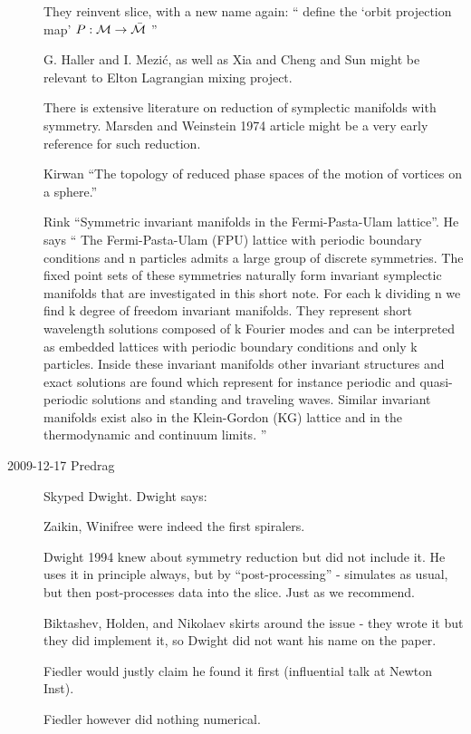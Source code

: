 \begin{description}
They reinvent slice, with a new name again:
``
define the `orbit projection map'
$P: {\cal M} \to \bar{\cal M} $
''

G. Haller and I. Mezi\'c, as well as Xia
and Cheng and Sun might be relevant to Elton
Lagrangian mixing project.

There is extensive literature on reduction of symplectic manifolds with
symmetry.
Marsden and Weinstein 1974 article
might be a very early reference for such reduction.

Kirwan ``The topology of reduced phase spaces of
the motion of vortices on a sphere.''

 Rink
``Symmetric invariant manifolds in
  the  {Fermi-Pasta-Ulam} lattice''. He says ``
The Fermi-Pasta-Ulam (FPU) lattice with periodic boundary
conditions and n particles admits a large group of discrete
symmetries. The fixed point sets of these symmetries naturally
form invariant symplectic manifolds that are investigated in
this short note. For each k dividing n we find k degree of
freedom invariant manifolds. They represent short wavelength
solutions composed of k Fourier modes and can be interpreted as
embedded lattices with periodic boundary conditions and only k
particles. Inside these invariant manifolds other invariant
structures and exact solutions are found which represent for
instance periodic and quasi-periodic solutions and standing and
traveling waves. Similar invariant manifolds exist also in the
Klein-Gordon (KG) lattice and in the thermodynamic and
continuum limits.
''

\item[2009-12-17 Predrag] Skyped Dwight.
Dwight says:

Zaikin, Winifree were indeed the first spiralers.

Dwight 1994 knew about symmetry reduction but did not
include it. He uses it in principle always, but by ``post-processing''
- simulates as usual, but then post-processes data into the slice.
Just as we recommend.

Biktashev, Holden, and Nikolaev
skirts around the issue - they wrote it
 but they did implement it, so Dwight did not want his name on
the paper.

{Fiedler} would justly claim he found it first (influential talk
at Newton Inst).

Fiedler \etal{} however did nothing numerical.


\end{description}
